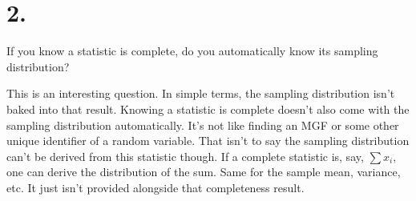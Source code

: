 \section{2.}

If you know a statistic is complete, do you automatically know its sampling distribution?

This is an interesting question. In simple terms, the sampling distribution isn't baked into that result. Knowing a statistic is complete doesn't also come with the sampling distribution automatically. It's not like finding an MGF or some other unique identifier of a random variable. That isn't to say the sampling distribution can't be derived from this statistic though. If a complete statistic is, say, $\sum x_i$, one can derive the distribution of the sum. Same for the sample mean, variance, etc. It just isn't provided alongside that completeness result. 
